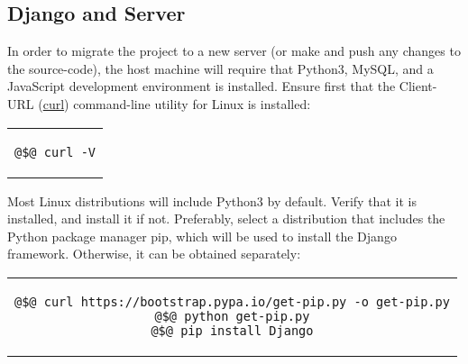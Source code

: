 \documentclass[11pt]{article}
\begin{document}
\subsection{Django and Server}
In order to migrate the project to a new server (or make and push any changes to the source-code),
the host machine will require that Python3, MySQL, and a JavaScript development environment is
installed. Ensure first that the Client-URL (\url{curl}) command-line utility for Linux is
installed:
\begin{center} \begin{tabular}{c} \begin{lstlisting}[linewidth=1.75cm]
@$@ curl -V
\end{lstlisting} \end{tabular} \end{center}
If not, install it using your system's appropriate package-installation tool. For Debian, Ubuntu,
or related distributions, use:
\begin{center} \begin{tabular}{c} \begin{lstlisting}[linewidth=5cm]
@$@ sudo apt-get install curl
\end{lstlisting} \end{tabular} \end{center}
Most Linux distributions will include Python3 by default. Verify that it is installed, and install
it if not. Preferably, select a distribution that includes the Python package manager pip, which
will be used to install the Django framework. Otherwise, it can be obtained separately:
\begin{center} \begin{tabular}{c} \begin{lstlisting}[linewidth=10.8cm]
@$@ curl https://bootstrap.pypa.io/get-pip.py -o get-pip.py
@$@ python get-pip.py
@$@ pip install Django
\end{lstlisting} \end{tabular} \end{center}
To configure the project's database, ensure that SQLite (\url{v.3.30.1} or later) is installed on the
host-machine. The system's tables are structured as follows:
\begin{figure}[H]
\texttt{[image: tables.png]}
\centering
\end{figure}
To run the server on the new host-machine, begin by ensuring that all required dependencies are
first installed:
\begin{center} \begin{tabular}{c} \begin{lstlisting}[linewidth=6cm]
@$@ pip3 install -r requirements.txt
@$@ pip3 install django-allauth
@$@ pip3 install channels
@$@ pip3 install django-rest-auth
@$@ pip3 install channels_redis
@$@ pip3 install "whitenoise <4"
@$@ pip3 install service_identity
\end{lstlisting} \end{tabular} \end{center}
\end{document}
